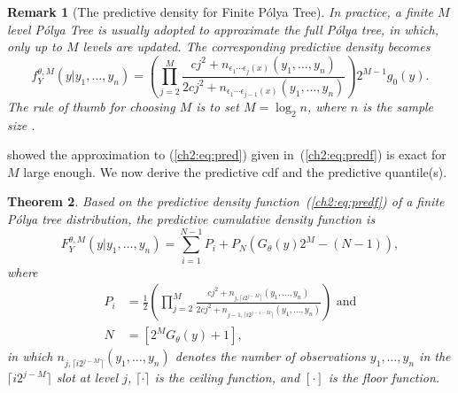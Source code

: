 \documentclass[12pt]{article}
\newtheorem{thm}{Theorem}[section]
\newtheorem{rmk}[thm]{Remark}
\newcommand{\polya}{P\'{o}lya}
\begin{document}
\begin{rmk}[The predictive density for Finite \polya{} Tree]
  In practice, a finite $M$ level \polya{} Tree is usually adopted to
  approximate the full \polya{} tree, in which, only up to $M$ levels
  are updated. The corresponding predictive density becomes
  \begin{equation}
    \label{ch2:eq:predf}
    f_Y^{\theta, M} (y|y_1, \ldots, y_n)  =  \left(
      \prod_{j=2}^M \frac{cj^2 + n_{\epsilon_1 \cdots \epsilon_j(x) }(y_1, \ldots, y_n)}{2cj^2
        + n_{\epsilon_1 \cdots \epsilon_{j-1}(x)}(y_1, \ldots, y_n)}
    \right)2^{M-1} g_0(y).
  \end{equation}
  The rule of thumb for choosing $M$ is to set $M=\log_2n$, where $n$
  is the sample size \citep{hanson2002}.
\end{rmk}

\citet{hanson2002} showed the approximation to (\ref{ch2:eq:pred}) given
in~(\ref{ch2:eq:predf}) is exact for $M$ large enough.  We now derive the
predictive cdf and the predictive quantile(s).

\begin{thm}
  Based on the predictive density function~(\ref{ch2:eq:predf}) of a
  finite \polya{} tree distribution, the predictive cumulative density
  function is
  \begin{equation}
    \label{ch2:eq:cdf}
    F^{\theta,M}_Y(y|y_1, \ldots, y_n) = \sum_{i=1}^{N-1} P_{i} + P_N
    \left( G_{\theta}(y)2^M -(N-1) \right),
  \end{equation}
  where
  \begin{align*}
    P_i &= \frac{1}{2} \left(\prod_{j=2}^M \frac{cj^2 + n_{j,\lceil
          i2^{j-M} \rceil}(y_1, \ldots, y_n)}{2cj^2 + n_{j-1,\lceil
          i2^{j-1-M} \rceil}(y_{1 },\ldots, y_n)} \right) \mbox{ and}\\
    N & = \left[ 2^{M } G_{\theta}(y) +1\right],
  \end{align*}
  in which $n_{j,\lceil i2^{j-M} \rceil}(y_1, \ldots, y_n)$ denotes
  the number of observations $y_1, \ldots, y_n$ in the $\lceil
  i2^{j-M} \rceil$ slot at level $j$, $\lceil \cdot \rceil$ is the
  ceiling function, and $[ \cdot ]$ is the floor function.
\end{thm}
\end{document}
